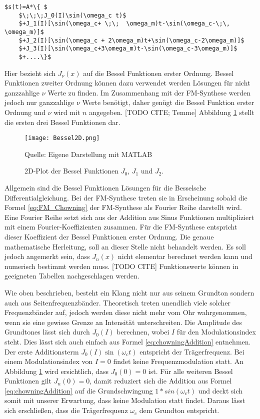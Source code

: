 \begin{center}
\label{eq:chowningAddition}
\begin{lstlisting}[mathescape]
$s(t)=A*\{ $
	$\;\;\;J_0(I)\sin(\omega_c t)$
	$+J_1(I)[\sin(\omega_c+ \;\;  \omega_m)t-\sin(\omega_c-\;\, \omega_m)]$
	$+J_2(I)[\sin(\omega_c + 2\omega_m)t+\sin(\omega_c-2\omega_m)]$
	$+J_3(I)[\sin(\omega_c+3\omega_m)t-\sin(\omega_c-3\omega_m)]$
	$+....\}$
\end{lstlisting}
\end{center}

Hier bezieht sich $J_\nu(x)$ auf die Bessel Funktionen erster Ordnung. Bessel Funktionen zweiter Ordnung können dazu verwendet werden Lösungen für nicht ganzzahlige $\nu$ Werte zu finden. Im Zusammenhang mit der FM-Synthese werden jedoch nur ganzzahlige $\nu$ Werte benötigt, daher genügt die Bessel Funktion erster Ordnung und $\nu$ wird mit $n$ angegeben. [TODO CITE; Temme] Abbildung \ref{fig:bessel2D} stellt die ersten drei Bessel Funktionen dar.


\begin{figure} [ht]
\centering
  \texttt{[image: Bessel2D.png]}
\caption{2D-Plot der Bessel Funktionen $J_0$, $J_1$ und $J_2$.}
\label{fig:bessel2D}
Quelle: Eigene Darstellung mit MATLAB
\end{figure}

\FloatBarrier


Allgemein sind die Bessel Funktionen Lösungen für die Besselsche Differentialgleichung. Bei der FM-Synthese treten sie in Erscheinung sobald die Formel \ref{eq:FM_Chowning} der FM-Synthese als Fourier Reihe darstellt wird. Eine Fourier Reihe setzt sich aus der Addition aus Sinus Funktionen multipliziert mit einem Fourier-Koeffizienten zusammen. Für die FM-Synthese entspricht dieser Koeffizient der Bessel Funktionen erster Ordnung. \cite[S. 221]{lathi} Die genaue mathematische Herleitung, soll an dieser Stelle nicht behandelt werden. Es soll jedoch angemerkt sein, dass $J_n(x)$ nicht elementar berechnet werden kann und numerisch bestimmt werden muss. [TODO CITE] \cite[S. 385]{abramowitz} Funktionswerte können in geeigneten Tabellen nachgeschlagen werden. \cite{davis}


Wie oben beschrieben, besteht ein Klang nicht nur aus seinem Grundton sondern auch aus Seitenfrequenzbänder. Theoretisch treten unendlich viele solcher Frequenzbänder auf, jedoch werden diese nicht mehr vom Ohr wahrgenommen, wenn sie eine gewisse Grenze an Intensität unterschreiten. Die Amplitude des Grundtones lässt sich durch $J_0(I)$ berechnen, wobei $I$ für den Modulationsindex steht. Dies lässt sich auch einfach aus Formel \ref{eq:chowningAddition} entnehmen. Der erste Additionsterm $J_0(I)\sin(\omega_c t)$ entspricht der Trägerfrequenz. Bei einem Modulationsindex von $I=0$ findet keine Frequenzmodulation statt. An Abbildung \ref{fig:bessel2D} wird ersichtlich, dass $J_0(0)=0$ ist. Für alle weiteren Bessel Funktionen gilt $J_n(0)=0$, damit reduziert sich die Addition aus Formel \ref{eq:chowningAddition} auf die Grundschwingung $1*sin(\omega_c t)$ und deckt sich somit mit unserer Erwartung, dass keine Modulation statt findet. Daraus lässt sich erschließen, dass die Trägerfrequenz $\omega_c$ dem Grundton entspricht.

